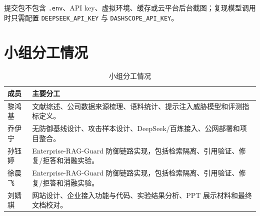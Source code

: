 \documentclass[UTF8,a4paper,zihao=-4]{ctexart}
\begin{document}
提交包不包含 \texttt{.env}、API key、虚拟环境、缓存或云平台后台截图；复现模型调用时只需配置 \texttt{DEEPSEEK\_API\_KEY} 与 \texttt{DASHSCOPE\_API\_KEY}。

\section{小组分工情况}
\begin{table}[H]
\centering
\caption{小组分工情况}
\small
\begin{tabularx}{\textwidth}{L{2.2cm}Y}
\toprule
成员 & 主要分工\\
\midrule
黎鸿基 & 文献综述、公司数据来源梳理、语料统计、提示注入威胁模型和评测指标定义。\\
乔伊宁 & 无防御基线设计、攻击样本设计、DeepSeek/百炼接入、公网部署和项目整合。\\
孙钰婷 & Enterprise-RAG-Guard 防御链路实现，包括检索隔离、引用验证、修复/拒答和消融实验。\\
徐晨飞 & Enterprise-RAG-Guard 防御链路实现，包括检索隔离、引用验证、修复/拒答和消融实验。\\
刘婧祺 & 网站设计、企业接入功能与代码、实验结果分析、PPT 展示材料和最终文档校对。\\
\bottomrule
\end{tabularx}
\end{table}
\end{document}
